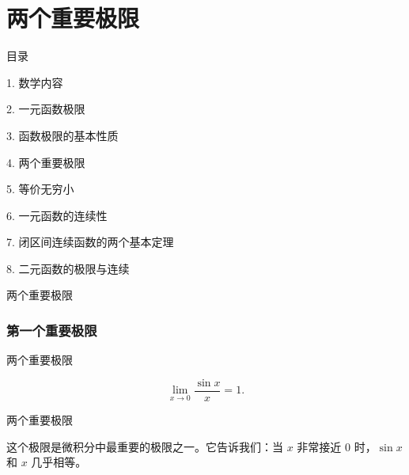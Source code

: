 \documentclass[aspectratio=169,10pt,fontset=fandol]{ctexbeamer}
\begin{document}
\section{两个重要极限}
\begin{frame}[t,fragile]{目录}
\normalsize
{\color{black}\normalsize 1. 数学内容\par}\vspace{0.3em}
{\color{black}\normalsize 2. 一元函数极限\par}\vspace{0.3em}
{\color{black}\normalsize 3. 函数极限的基本性质\par}\vspace{0.3em}
{\color{blue}\normalsize 4. 两个重要极限\par}\vspace{0.3em}
{\color{gray!40}\normalsize 5. 等价无穷小\par}\vspace{0.3em}
{\color{gray!40}\normalsize 6. 一元函数的连续性\par}\vspace{0.3em}
{\color{gray!40}\normalsize 7. 闭区间连续函数的两个基本定理\par}\vspace{0.3em}
{\color{gray!40}\normalsize 8. 二元函数的极限与连续\par}\vspace{0.3em}
\end{frame}
\begin{frame}[t,fragile]{两个重要极限}
\normalsize
{\normalsize
\subsubsection*{第一个重要极限}


}
\end{frame}
\begin{frame}[t,fragile]{两个重要极限}
\normalsize
{\normalsize
\[
\lim_{x \to 0} \frac{\sin x}{x} = 1.
\]


}
\end{frame}
\begin{frame}[t,fragile]{两个重要极限}
\normalsize
{\normalsize
这个极限是微积分中最重要的极限之一。它告诉我们：当 \(x\) 非常接近 0 时，\(\sin x\) 和 \(x\) 几乎相等。


}
\end{frame}
\end{document}
